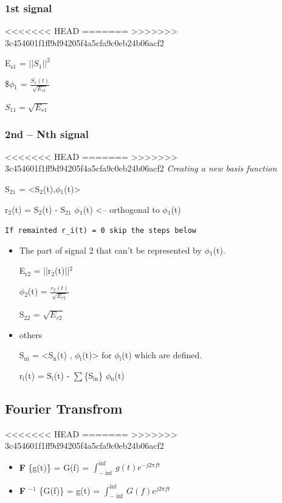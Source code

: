 \documentclass[11pt]{article}
\begin{document}
\subsubsection{1st signal}
<<<<<<< HEAD
\label{sec-1-3-1}
=======
\label{sec-4-3-1}
>>>>>>> 3c454601f1ff9d94205f4a5cfa9c0eb24b06acf2

E$_{\text{s1}}$ = $||S_{1}||^2$

\$$\phi$$_{\text{1}}$ = $\frac{S_1(t)}{\sqrt{E_{s1}}}$

$S_{11} = \sqrt{E_{s1}}$

\subsubsection{2nd -- Nth signal}
<<<<<<< HEAD
\label{sec-1-3-2}
=======
\label{sec-4-3-2}
>>>>>>> 3c454601f1ff9d94205f4a5cfa9c0eb24b06acf2
\emph{Creating a new basis function}

S$_{\text{21}}$ = <S$_{\text{2}}$(t),$\phi$$_{\text{1}}$(t)>



r$_{\text{2}}$(t) = S$_{\text{2}}$(t) - S$_{\text{21}}$ $\phi$$_{\text{1}}$(t) <-- orthogonal to $\phi$$_{\text{1}}$(t)

\texttt{If remainted r\_i(t) = 0 skip the steps below}

\begin{itemize}
\item The part of signal 2 that can't be represented by $\phi$$_{\text{1}}$(t).

E$_{\text{r2}}$ = ||r$_{\text{2}}$(t)||$^{\text{2}}$

$\phi$$_{\text{2}}$(t) = $\frac{r_2(t)}{\sqrt{E_{r2}}}$

S$_{\text{22}}$ = $\sqrt{E_{r2}}$
\item others

S$_{\text{ni}}$ = <S$_{\text{n}}$(t) , $\phi$$_{\text{i}}$(t)> for $\phi$$_{\text{i}}$(t) which are defined.

r$_{\text{i}}$(t) = S$_{\text{i}}$(t) - $\sum$\{S$_{\text{in}}$\} $\phi$$_{\text{n}}$(t)
\end{itemize}

\subsection{Fourier Transfrom}
<<<<<<< HEAD
\label{sec-1-4}
=======
\label{sec-4-4}
>>>>>>> 3c454601f1ff9d94205f4a5cfa9c0eb24b06acf2

\begin{itemize}
\item \textbf{F} \{g(t)\} = G(f) = $\int_{-\inf}^{\inf} g(t) e^{-j2\pi ft}$

\item \textbf{F} $^{-1}$ \{G(f)\} = g(t) = $\int_{-\inf}^{\inf} G(f) e^{j2\pi ft}$
\end{itemize}
\end{document}
